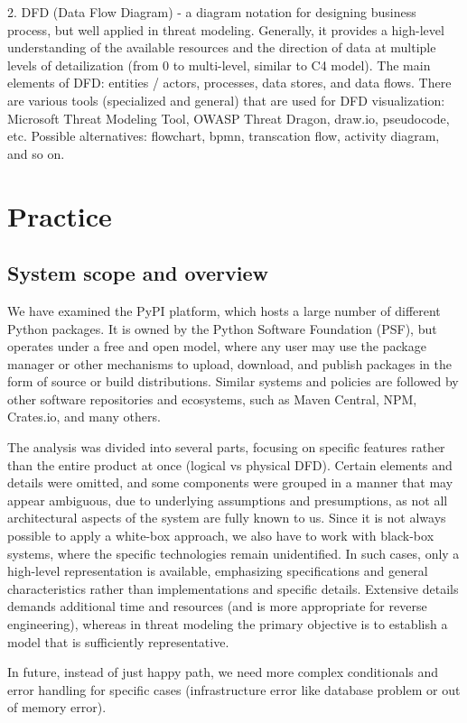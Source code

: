 \documentclass[letterpaper,12pt]{report}
\begin{document}
2. DFD (Data Flow Diagram) - a diagram notation for designing business process, but well applied in threat modeling. Generally, it provides a high-level understanding of the available resources and the direction of data at multiple levels of detailization (from 0 to multi-level, similar to C4 model). The main elements of DFD: entities / actors, processes, data stores, and data flows. There are various tools (specialized and general) that are used for DFD visualization: Microsoft Threat Modeling Tool, OWASP Threat Dragon, draw.io, pseudocode, etc. Possible alternatives: flowchart, bpmn, transcation flow, activity diagram, and so on.

\section{Practice}

\subsection{System scope and overview}
We have examined the PyPI platform, which hosts a large number of different Python packages. It is owned by the Python Software Foundation (PSF), but operates under a free and open model, where any user may use the package manager or other mechanisms to upload, download, and publish packages in the form of source or build distributions. Similar systems and policies are followed by other software repositories and ecosystems, such as Maven Central, NPM, Crates.io, and many others.

The analysis was divided into several parts, focusing on specific features rather than the entire product at once (logical vs physical DFD). Certain elements and details were omitted, and some components were grouped in a manner that may appear ambiguous, due to underlying assumptions and presumptions, as not all architectural aspects of the system are fully known to us. Since it is not always possible to apply a white-box approach, we also have to work with black-box systems, where the specific technologies remain unidentified. In such cases, only a high-level representation is available, emphasizing specifications and general characteristics rather than implementations and specific details. Extensive details demands additional time and resources (and is more appropriate for reverse engineering), whereas in threat modeling the primary objective is to establish a model that is sufficiently representative.

In future, instead of just happy path, we need more complex conditionals and error handling for specific cases (infrastructure error like database problem or out of memory error).
\end{document}
